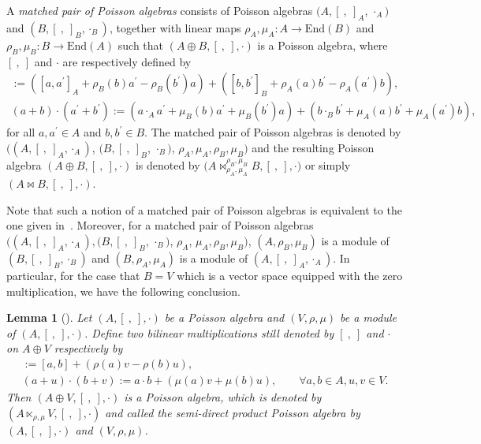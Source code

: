 \documentclass[pdftex]{sigma}
\numberwithin{equation}{section}
\newtheorem{Lemma}[Theorem]{Lemma}
\newcommand{\End}{\mathrm{End}}
\begin{document}
\begin{Definition}\label{def:matpoi}
 A \textit{matched pair of Poisson algebras} consists of Poisson algebras $(A, [\ ,\ ]_A$, $\cdot_A)$ and $(B, [\ ,\ ]_B,\cdot_B)$, together with linear maps $\rho_A, \mu_A\colon A \to \End(B)$ and $\rho_B, \mu_B\colon B \to \End(A)$ such that $(A \oplus B, [\ ,\ ], \cdot)$ is a Poisson algebra, where $[\ ,\ ]$ and $\cdot$ are respectively defined by
 \begin{gather*}
 	[a + b, a^\prime + b^\prime] := ([a, a^\prime]_A + \rho_B(b)a^\prime - \rho_B(b^\prime) a ) + ([b, b^\prime]_B + \rho_A(a)b^\prime - \rho_A(a^\prime)b ), \\
 	(a + b) \cdot (a^\prime + b^\prime) := (a \cdot_A a^\prime + \mu_B(b)a^\prime + \mu_B(b^\prime)a) + (b \cdot_B b^\prime + \mu_A(a) b^\prime + \mu_A(a^\prime)b ),
 \end{gather*}
 for all $a,a^\prime\in A$ and $b,b^\prime\in B$.
 The matched pair of Poisson algebras is denoted by $((A, [\ ,\ ]_A, \cdot_A)$, $(B, [\ ,\ ]_B$, $\cdot_B)$, $\rho_A, \mu_A, \rho_B, \mu_B)$ and the resulting Poisson algebra $(A \oplus B, [\ ,\ ], \cdot)$ is denoted by $\big(A \bowtie_{\rho_A, \mu_A}^{\rho_B, \mu_B} B, [\ ,\ ], \cdot\big)$ or simply $(A \bowtie B, [\ ,\ ], \cdot)$.
\end{Definition}

Note that such a notion of a matched pair of Poisson algebras is equivalent to the one given in~\cite[Theorem 1]{ni2013poisson}.
Moreover, for a matched pair of Poisson algebras $((A, [\ ,\ ]_A, \cdot_A), (B, [\ ,\ ]_B$, $\cdot_B)$, $\rho_A$, $\mu_A, \rho_B, \mu_B)$, $(A,\rho_B,\mu_B)$ is a module of
$(B, [\ ,\ ]_B, \cdot_B)$ and $(B,\rho_A,\mu_A)$ is a module of $(A, [\ ,\ ]_A, \cdot_A)$. In particular, for the case that $B=V$ which is a vector
space equipped with the zero multiplication, we have the following conclusion.

\begin{Lemma}[\cite{ni2013poisson}]
 Let $(A, [\ ,\ ], \cdot)$ be a Poisson algebra and $(V, \rho,\mu)$ be a module of $(A, [\ ,\ ],
 \cdot)$.
 Define two bilinear multiplications still denoted by $[\ ,\ ]$ and
 $\cdot$ on $A\oplus V$ respectively by
	\begin{gather*}
 [(a+u), (b+v)] := [a,b] + (\rho(a)v - \rho(b)u),\\
 (a+u) \cdot (b+v) := a \cdot b + (\mu(a)v + \mu(b)u), \qquad
 \forall a, b \in A, u,v \in V.
 \end{gather*}
 Then $(A \oplus V, [\ ,\ ], \cdot)$ is a Poisson algebra, which is denoted by $(A \ltimes_{\rho, \mu} V, [\ ,\ ], \cdot)$ and called the \textit{semi-direct product Poisson algebra} by $(A, [\ ,\ ], \cdot)$ and $(V, \rho, \mu)$.
\end{Lemma}
\end{document}
